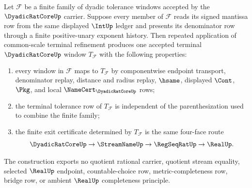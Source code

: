 \begin{theorem}
\label{thm:dyadicratcore-common-scale-terminal-refinement-directed-system}
Let $\mathcal{F}$ be a finite family of dyadic tolerance windows accepted by the $\DyadicRatCoreUp$ carrier. Suppose every member of $\mathcal{F}$ reads its signed mantissa row from the same displayed $\IntUp$ ledger and presents its denominator row through a finite positive-unary exponent history. Then repeated application of common-scale terminal refinement produces one accepted terminal $\DyadicRatCoreUp$ window $T_{\mathcal{F}}$ with the following properties:
\begin{enumerate}
\item every window in $\mathcal{F}$ maps to $T_{\mathcal{F}}$ by componentwise endpoint transport, denominator replay, distance and radius replay, $\hsame$, displayed $\Cont$, $\Pkg$, and local $\NameCert_{\DyadicRatCoreUp}$ rows;
\item the terminal tolerance row of $T_{\mathcal{F}}$ is independent of the parenthesization used to combine the finite family;
\item the finite exit certificate determined by $T_{\mathcal{F}}$ is the same four-face route
$$
\DyadicRatCoreUp \to \StreamNameUp \to \RegSeqRatUp \to \RealUp .
$$
\end{enumerate}
The construction exports no quotient rational carrier, quotient stream equality, selected $\RealUp$ endpoint, countable-choice row, metric-completeness row, bridge row, or ambient $\RealUp$ completeness principle.
\end{theorem}
